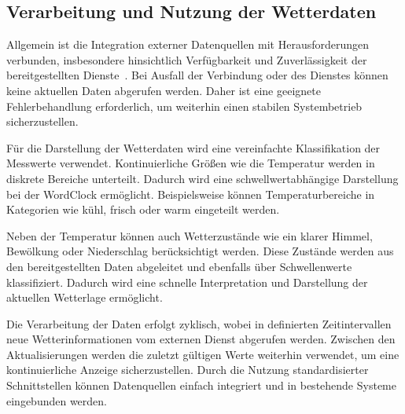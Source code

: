 \subsection{Verarbeitung und Nutzung der Wetterdaten}Allgemein ist die Integration externer Datenquellen mit Herausforderungen verbunden, insbesondere hinsichtlich Verfügbarkeit und Zuverlässigkeit der bereitgestellten Dienste~\cite{7123563}. 
Bei Ausfall der Verbindung oder des Dienstes können keine aktuellen Daten abgerufen werden. 
Daher ist eine geeignete Fehlerbehandlung erforderlich, um weiterhin einen stabilen Systembetrieb sicherzustellen.

Für die Darstellung der Wetterdaten wird eine vereinfachte Klassifikation der Messwerte verwendet. 
Kontinuierliche Größen wie die Temperatur werden in diskrete Bereiche unterteilt. 
Dadurch wird eine schwellwertabhängige Darstellung bei der WordClock ermöglicht. 
Beispielsweise können Temperaturbereiche in Kategorien wie kühl, frisch oder warm eingeteilt werden.

Neben der Temperatur können auch Wetterzustände wie ein klarer Himmel, Bewölkung oder Niederschlag berücksichtigt werden. 
Diese Zustände werden aus den bereitgestellten Daten abgeleitet und ebenfalls über Schwellenwerte klassifiziert. 
Dadurch wird eine schnelle Interpretation und Darstellung der aktuellen Wetterlage ermöglicht. 

Die Verarbeitung der Daten erfolgt zyklisch, wobei in definierten Zeitintervallen neue Wetterinformationen vom externen Dienst abgerufen werden. 
Zwischen den Aktualisierungen werden die zuletzt gültigen Werte weiterhin verwendet, um eine kontinuierliche Anzeige sicherzustellen.
Durch die Nutzung standardisierter Schnittstellen können Datenquellen einfach integriert und in bestehende Systeme eingebunden werden.
